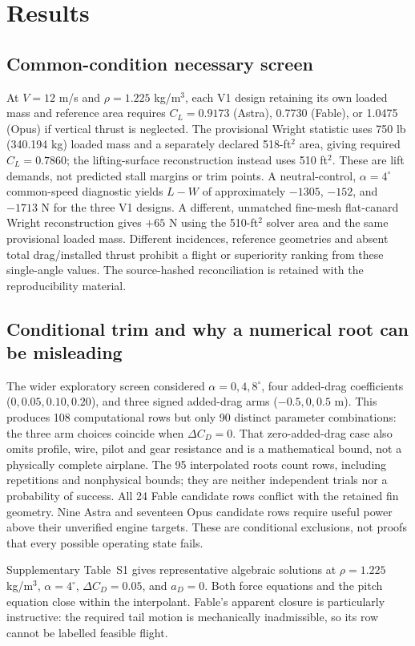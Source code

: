 \documentclass[11pt,a4paper]{article}
\begin{document}
\section{Results}
\subsection{Common-condition necessary screen}
At $V=12$ m/s and $\rho=1.225$ kg/m$^3$, each V1 design retaining its own loaded mass and reference area requires $C_L=0.9173$ (Astra), 0.7730 (Fable), or 1.0475 (Opus) if vertical thrust is neglected. The provisional Wright statistic uses 750 lb (340.194 kg) loaded mass and a separately declared 518-ft$^2$ area, giving required $C_L=0.7860$; the lifting-surface reconstruction instead uses 510 ft$^2$. These are lift demands, not predicted stall margins or trim points. A neutral-control, $\alpha=4^\circ$ common-speed diagnostic yields $L-W$ of approximately $-1305$, $-152$, and $-1713$ N for the three V1 designs. A different, unmatched fine-mesh flat-canard Wright reconstruction gives $+65$ N using the 510-ft$^2$ solver area and the same provisional loaded mass. Different incidences, reference geometries and absent total drag/installed thrust prohibit a flight or superiority ranking from these single-angle values. The source-hashed reconciliation is retained with the reproducibility material.

\subsection{Conditional trim and why a numerical root can be misleading}
The wider exploratory screen considered $\alpha=0,4,8^\circ$, four added-drag coefficients ($0,0.05,0.10,0.20$), and three signed added-drag arms ($-0.5,0,0.5$ m). This produces 108 computational rows but only 90 distinct parameter combinations: the three arm choices coincide when $\Delta C_D=0$. That zero-added-drag case also omits profile, wire, pilot and gear resistance and is a mathematical bound, not a physically complete airplane. The 95 interpolated roots count rows, including repetitions and nonphysical bounds; they are neither independent trials nor a probability of success. All 24 Fable candidate rows conflict with the retained fin geometry. Nine Astra and seventeen Opus candidate rows require useful power above their unverified engine targets. These are conditional exclusions, not proofs that every possible operating state fails.

Supplementary Table~S1 gives representative algebraic solutions at $\rho=1.225$ kg/m$^3$, $\alpha=4^\circ$, $\Delta C_D=0.05$, and $a_D=0$. Both force equations and the pitch equation close within the interpolant. Fable's apparent closure is particularly instructive: the required tail motion is mechanically inadmissible, so its row cannot be labelled feasible flight.
\end{document}
